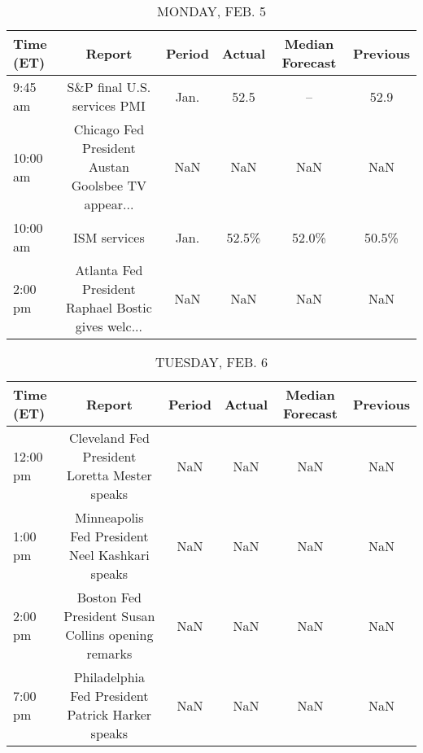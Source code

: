 \documentclass{article}%
\begin{document}
%
\normalsize%


\begin{table}[htbp]%
\caption{MONDAY, FEB. 5}%
\centering%
\begin{adjustbox}{width=1\textwidth}%
\begin{tabular}{lccccc}
\toprule
Time (ET) &                                             Report & Period & Actual & Median Forecast & Previous \\
\midrule
  9:45 am &                        S\&P final U.S. services PMI &   Jan. &   52.5 &              -- &     52.9 \\
 10:00 am & Chicago Fed President Austan Goolsbee TV appear... &    NaN &    NaN &             NaN &      NaN \\
 10:00 am &                                       ISM services &   Jan. &  52.5\% &           52.0\% &    50.5\% \\
  2:00 pm & Atlanta Fed President Raphael Bostic gives welc... &    NaN &    NaN &             NaN &      NaN \\
\bottomrule
\end{tabular}
%
\end{adjustbox}%
\end{table}

%


\begin{table}[htbp]%
\caption{TUESDAY, FEB. 6}%
\centering%
\begin{adjustbox}{width=1\textwidth}%
\begin{tabular}{lccccc}
\toprule
Time (ET) &                                             Report & Period & Actual & Median Forecast & Previous \\
\midrule
 12:00 pm &      Cleveland Fed President Loretta Mester speaks &    NaN &    NaN &             NaN &      NaN \\
  1:00 pm &     Minneapolis Fed President Neel Kashkari speaks &    NaN &    NaN &             NaN &      NaN \\
  2:00 pm & Boston Fed President Susan Collins opening remarks &    NaN &    NaN &             NaN &      NaN \\
  7:00 pm &   Philadelphia Fed President Patrick Harker speaks &    NaN &    NaN &             NaN &      NaN \\
\bottomrule
\end{tabular}
%
\end{adjustbox}%
\end{table}

%
\end{document}
